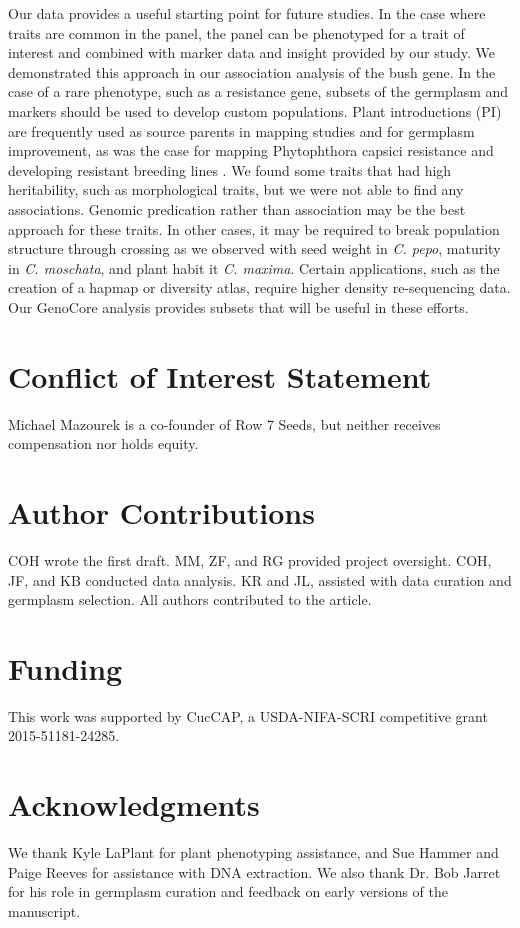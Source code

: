 \documentclass[utf8]{FrontiersinHarvard} %
\begin{document}
Our data provides a useful starting point for future studies. In the case where traits are common in the panel, the panel can be phenotyped for a trait of interest and combined with marker data and insight provided by our study. We demonstrated this approach in our association analysis of the bush gene. In the case of a rare phenotype, such as a resistance gene, subsets of the germplasm and markers should be used to develop custom populations. Plant introductions (PI) are frequently used as source parents in mapping studies and for germplasm improvement, as was the case for mapping Phytophthora capsici resistance and developing resistant breeding lines \citep{Vogel2021,LaPlant2020}. We found some traits that had high heritability, such as morphological traits, but we were not able to find any associations. Genomic predication rather than association may be the best approach for these traits. In other cases, it may be required to break population structure through crossing as we observed with seed weight in \textit{C. pepo}, maturity in \textit{C. moschata}, and plant habit it \textit{C. maxima}. Certain applications, such as the creation of a hapmap or diversity atlas, require higher density re-sequencing data. Our GenoCore analysis provides subsets that will be useful in these efforts.

\section*{Conflict of Interest Statement}
Michael Mazourek is a co-founder of Row 7 Seeds, but neither receives compensation nor holds equity.

\section*{Author Contributions}

COH wrote the first draft. MM, ZF, and RG provided project oversight. COH, JF, and KB conducted data analysis. KR and JL,  assisted with data curation and germplasm selection. All authors contributed to the article.

\section*{Funding}

This work was supported by CucCAP, a USDA-NIFA-SCRI competitive grant 2015-51181-24285.

\section*{Acknowledgments}
We thank Kyle LaPlant for plant phenotyping assistance, and Sue Hammer and Paige Reeves for assistance with DNA extraction. We also thank Dr. Bob Jarret for his role in germplasm curation and feedback on early versions of the manuscript. 
\end{document}
